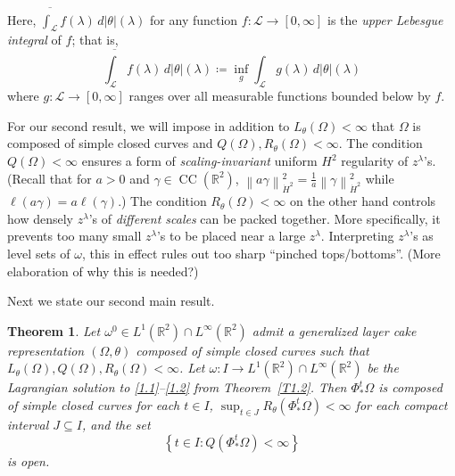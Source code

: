 \documentclass[reqno,centertags,12pt]{amsart}
\newtheorem{theorem}{Theorem}[section]
\theoremstyle{definition}
\numberwithin{equation}{section}
\newcommand{\norm}[1]{\left\|#1\right\|}
\newcommand{\set}[1]{\left\{ #1 \right\}}
\newcommand{\bbR}{{\mathbb{R}}}
\newcommand{\tht}{\theta}
\begin{document}
Here, $\overline{\int_{\mathcal{L}}}f(\lambda)\,d|\theta|(\lambda)$
for any function $f\colon\mathcal{L}\to[0,\infty]$ is the \emph{upper Lebesgue integral}
of $f$; that is,
\[
    \overline{\int_{\mathcal{L}}}f(\lambda)\,d|\theta|(\lambda)
    \coloneqq \inf_{g}\int_{\mathcal{L}}g(\lambda)\,d|\theta|(\lambda)
\]
where $g\colon\mathcal{L}\to[0,\infty]$ ranges over all
measurable functions bounded below by $f$.

For our second result, we will impose in addition to $L_{\tht}(\Omega)<\infty$
that $\Omega$ is composed of simple closed curves and
$Q(\Omega), R_{\tht}(\Omega) < \infty$. The condition $Q(\Omega)<\infty$ ensures
a form of \emph{scaling-invariant} uniform $H^{2}$ regularity of $z^{\lambda}$'s.
(Recall that for $a>0$ and $\gamma\in\operatorname{CC}(\bbR^{2})$,
$\norm{a\gamma}_{\dot{H}^{2}}^{2} = \frac{1}{a}\norm{\gamma}_{\dot{H}^{2}}^{2}$
while $\ell(a\gamma) = a\ell(\gamma)$.)
The condition $R_{\tht}(\Omega)<\infty$ on the other hand controls how densely
$z^{\lambda}$'s of \emph{different scales} can be packed together.
More specifically, it prevents too many small $z^{\lambda}$'s to be placed
near a large $z^{\lambda}$. Interpreting $z^{\lambda}$'s as level sets of $\omega$,
this in effect rules out too sharp ``pinched tops/bottoms''.
(More elaboration of why this is needed?)

Next we state our second main result.

\begin{theorem}\label{T1.4}
    Let $\omega^{0}\in L^{1}(\bbR^{2})\cap L^{\infty}(\bbR^{2})$ admit a
    generalized layer cake representation $(\Omega,\theta)$
    composed of simple closed curves such that $L_{\tht}(\Omega), Q(\Omega), R_{\tht}(\Omega) < \infty$.
    Let $\omega\colon I\to L^{1}(\bbR^{2})\cap L^{\infty}(\bbR^{2})$ be
    the Lagrangian solution to \eqref{1.1}--\eqref{1.2}
from Theorem~\ref{T1.2}.
    Then $\Phi_{*}^{t}\Omega$ is composed of simple closed curves for each $t\in I$,
    $\sup_{t\in J}R_{\tht}(\Phi_{*}^{t}\Omega) < \infty$ for each compact interval
    $J\subseteq I$, and the set
    \[
        \set{t\in I \colon Q(\Phi_{*}^{t}\Omega) < \infty}
    \]
    is  open.
\end{theorem}
\end{document}
